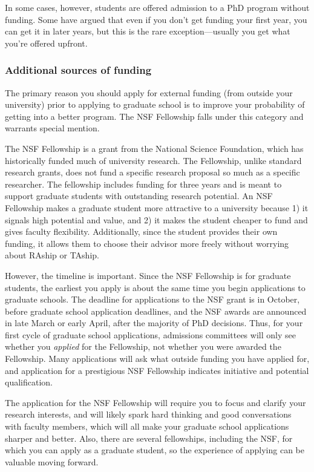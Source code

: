 \documentclass[11pt]{article}
\begin{document}
In some cases, however, students are offered admission to a PhD program without funding. Some have argued that even if you don’t get funding your first year, you can get it in later years, but this is the rare exception—usually you get what you’re offered upfront.

\subsubsection*{Additional sources of funding}
The primary reason you should apply for external funding (from outside your university) prior to applying to graduate school is to improve your probability of getting into a better program. The NSF Fellowship falls under this category and warrants special mention.

The NSF Fellowship is a grant from the National Science Foundation, which has historically funded much of university research. The Fellowship, unlike standard research grants, does not fund a specific research proposal so much as a specific researcher. The fellowship includes funding for three years and is meant to support graduate students with outstanding research potential. An NSF Fellowship makes a graduate student more attractive to a university because 1) it signals high potential and value, and 2) it makes the student cheaper to fund and gives faculty flexibility. Additionally, since the student provides their own funding, it allows them to choose their advisor more freely without worrying about RAship or TAship.

However, the timeline is important. Since the NSF Fellowship is for graduate students, the earliest you apply is about the same time you begin applications to graduate schools. The deadline for applications to the NSF grant is in October, before graduate school application deadlines, and the NSF awards are announced in late March or early April, after the majority of PhD decisions. Thus, for your first cycle of graduate school applications, admissions committees will only see whether you \emph{applied} for the Fellowship, not whether you were awarded the Fellowship. Many applications will ask what outside funding you have applied for, and application for a prestigious NSF Fellowship indicates initiative and potential qualification.

The application for the NSF Fellowship will require you to focus and clarify your research interests, and will likely spark hard thinking and good conversations with faculty members, which will all make your graduate school applications sharper and better. Also, there are several fellowships, including the NSF, for which you can apply as a graduate student, so the experience of applying can be valuable moving forward.
\end{document}
